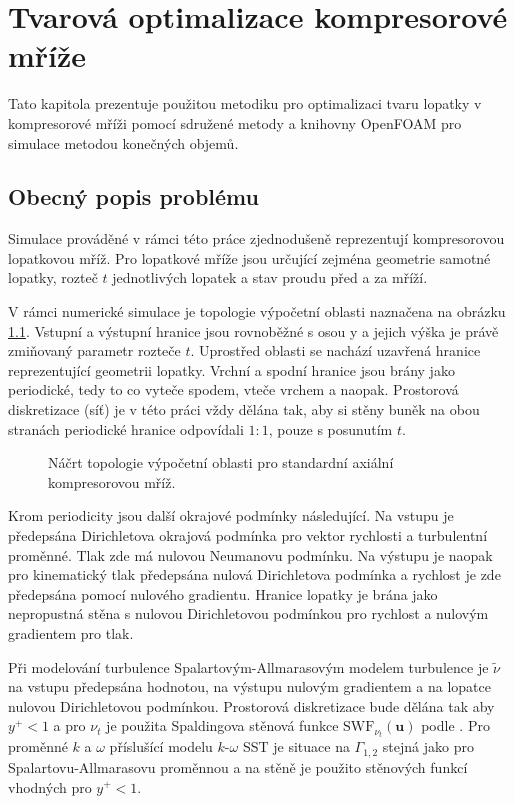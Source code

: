 
\chapter{Tvarová optimalizace kompresorové mříže}

Tato kapitola prezentuje použitou metodiku pro optimalizaci tvaru lopatky v kompresorové mříži pomocí sdružené metody a knihovny OpenFOAM pro simulace metodou konečných objemů.

\section{Obecný popis problému}

Simulace prováděné v rámci této práce zjednodušeně reprezentují kompresorovou lopatkovou mříž. Pro lopatkové mříže jsou určující zejména geometrie samotné lopatky, rozteč $ t $ jednotlivých lopatek a stav proudu před a za mříží.

V rámci numerické simulace je topologie výpočetní oblasti naznačena na obrázku \ref{fig:vypocetni_oblast}. Vstupní a výstupní hranice jsou rovnoběžné s osou y a jejich výška je právě zmiňovaný parametr rozteče $ t $. Uprostřed oblasti se nachází uzavřená hranice reprezentující geometrii lopatky. Vrchní a spodní hranice jsou brány jako periodické, tedy to co vyteče spodem, vteče vrchem a naopak. Prostorová diskretizace (síť) je v této práci vždy dělána tak, aby si stěny buněk na obou stranách periodické hranice odpovídali $ 1:1 $, pouze s posunutím $ t $.

\begin{figure}
	\def\svgwidth{0.85\textwidth}
	\graphicspath{{img/inkscape/}}
	
	\caption[Topologie výpočetní oblasti]{Náčrt topologie výpočetní oblasti pro standardní axiální kompresorovou mříž.}
	\label{fig:vypocetni_oblast}
\end{figure}

Krom periodicity jsou další okrajové podmínky následující. Na vstupu je předepsána Dirichletova okrajová podmínka pro vektor rychlosti a turbulentní proměnné. Tlak zde má nulovou Neumanovu podmínku. Na výstupu je naopak pro kinematický tlak předepsána nulová Dirichletova podmínka a rychlost je zde předepsána pomocí nulového gradientu. Hranice lopatky je brána jako nepropustná stěna s nulovou Dirichletovou podmínkou pro rychlost a nulovým gradientem pro tlak.

Při modelování turbulence Spalartovým-Allmarasovým modelem turbulence je $ \tilde{\nu} $ na vstupu předepsána hodnotou, na výstupu nulovým gradientem a na lopatce nulovou Dirichletovou podmínkou. Prostorová diskretizace bude dělána tak aby $ y^+<1 $ a pro $ \nu_t $ je použita Spaldingova stěnová funkce $ \mathrm{SWF}_{\nu_t}(\mathbf{u}) $ podle \cite{spalding1961single}. Pro proměnné $ k $ a $ \omega $ příslušící modelu $ k\text{-}\omega $ SST je situace na $ \Gamma_{1,2} $ stejná jako pro Spalartovu-Allmarasovu proměnnou a na stěně je použito stěnových funkcí \cite{kalitzin2005near} vhodných pro $ y^+<1 $. 

